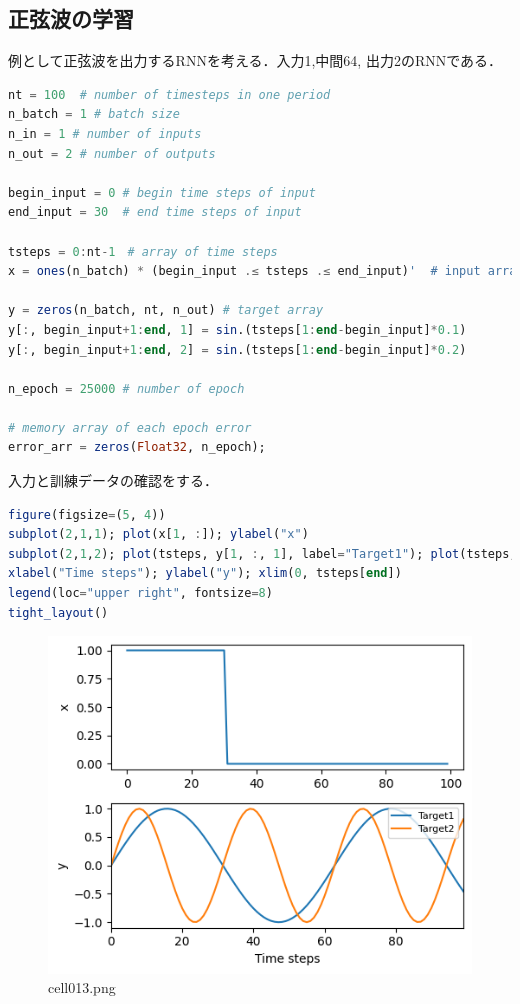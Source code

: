 \subsection{正弦波の学習}
例として正弦波を出力するRNNを考える．入力1,中間64, 出力2のRNNである．
\begin{lstlisting}[language=julia]
nt = 100  # number of timesteps in one period
n_batch = 1 # batch size
n_in = 1 # number of inputs
n_out = 2 # number of outputs

begin_input = 0 # begin time steps of input
end_input = 30  # end time steps of input

tsteps = 0:nt-1　# array of time steps
x = ones(n_batch) * (begin_input .≤ tsteps .≤ end_input)'  # input array

y = zeros(n_batch, nt, n_out) # target array
y[:, begin_input+1:end, 1] = sin.(tsteps[1:end-begin_input]*0.1)
y[:, begin_input+1:end, 2] = sin.(tsteps[1:end-begin_input]*0.2)

n_epoch = 25000 # number of epoch

# memory array of each epoch error
error_arr = zeros(Float32, n_epoch); 
\end{lstlisting}
入力と訓練データの確認をする．
\begin{lstlisting}[language=julia]
figure(figsize=(5, 4))
subplot(2,1,1); plot(x[1, :]); ylabel("x")
subplot(2,1,2); plot(tsteps, y[1, :, 1], label="Target1"); plot(tsteps, y[1, :, 2], label="Target2")
xlabel("Time steps"); ylabel("y"); xlim(0, tsteps[end])
legend(loc="upper right", fontsize=8)
tight_layout()
\end{lstlisting}
\begin{figure}[ht]
	\centering
	\includegraphics[scale=0.8, max width=\linewidth]{./fig/solve-credit-assignment-problem/bptt/cell013.png}
	\caption{cell013.png}
	\label{cell013.png}
\end{figure}
